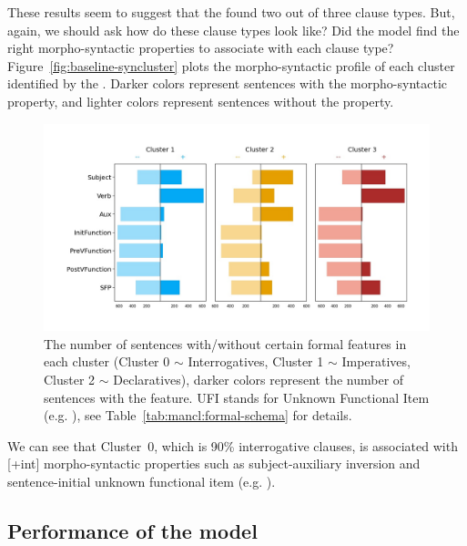These results seem to suggest that the \dlearnerabbr{} found two out of three clause types. But, again, we should ask how do these clause types look like? Did the model find the right morpho-syntactic properties to associate with each clause type? Figure~\ref{fig:baseline-syncluster} plots the morpho-syntactic profile of each cluster identified by the \dlearnerabbr{}. Darker colors represent sentences with the morpho-syntactic property, and lighter colors represent sentences without the property. 

\begin{figure}[H]
    \centering
    \includegraphics[width=1\textwidth]{figures/man-baseline-conservative-syncluster.jpg}
    \caption{The number of sentences with/without certain formal features in each cluster (Cluster 0 $\sim$ Interrogatives, Cluster 1 $\sim$ Imperatives, Cluster 2 $\sim$ Declaratives), darker colors represent the number of sentences with the feature. UFI stands for Unknown Functional Item (e.g. \twh{}), see Table~\ref{tab:mancl:formal-schema} for details.}
    \label{fig:man-baseline-syncluster}
\end{figure}

We can see that Cluster~$0$, which is 90\% interrogative clauses, is associated with [+int] morpho-syntactic properties such as subject-auxiliary inversion and sentence-initial unknown functional item (e.g. \twh{}).

\subsection{Performance of the \plearnerabbr{} model}
\label{sec:mancl:model:results:d}

